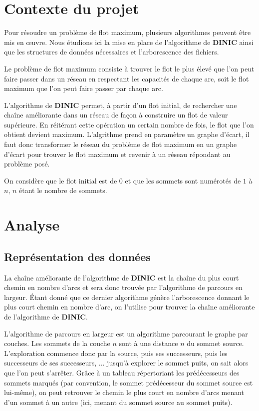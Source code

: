 \documentclass[11pt, a4paper]{report}
\begin{document}
	\tableofcontents


	\chapter{Contexte du projet}
	Pour résoudre un problème de flot maximum, plusieurs algorithmes peuvent être mis en œuvre. Nous étudions ici la mise en place de l'algorithme de \textbf{DINIC} ainsi que les structures de données nécessaires et l'arborescence des fichiers.

	Le problème de flot maximum consiste à trouver le flot le plus élevé que l'on peut faire passer dans un réseau en respectant les capacités de chaque arc, soit le flot maximum que l'on peut faire passer par chaque arc.

	L'algorithme de \textbf{DINIC} permet, à partir d'un flot initial, de rechercher une chaîne améliorante dans un réseau de façon à construire un flot de valeur supérieure. En réitérant cette opération un certain nombre de fois, le flot que l'on obtient devient maximum. L'algrithme prend en paramètre un graphe d'écart, il faut donc transformer le réseau du problème de flot maximum en un graphe d'écart pour trouver le flot maximum et revenir à un réseau répondant au problème posé.

	On considère que le flot initial est de 0 et que les sommets sont numérotés de $1$ à $n$, $n$ étant le nombre de sommets.



	\chapter{Analyse}
	\section{Représentation des données}
	La chaîne améliorante de l'algorithme de \textbf{DINIC} est la chaîne du plus court chemin en nombre d'arcs et sera donc trouvée par l'algorithme de parcours en largeur. Étant donné que ce dernier algorithme génère l'arborescence donnant le plus court chemin en nombre d'arc, on l'utilise pour trouver la chaîne améliorante de l'algorithme de \textbf{DINIC}.

	L’algorithme de parcours en largeur est un algorithme parcourant le graphe par couches. Les sommets de la couche $n$ sont à une distance $n$ du sommet source. L’exploration commence donc par la source, puis ses successeurs, puis les successeurs de ses successeurs, ... jusqu’à explorer le sommet puits, on sait alors que l’on peut s’arrêter. Grâce à un tableau répertoriant les prédécesseurs des sommets marqués (par convention, le sommet prédécesseur du sommet source est lui-même), on peut retrouver le chemin le plus court en nombre d'arcs menant d’un sommet à un autre (ici, menant du sommet source au sommet puits).
\end{document}
